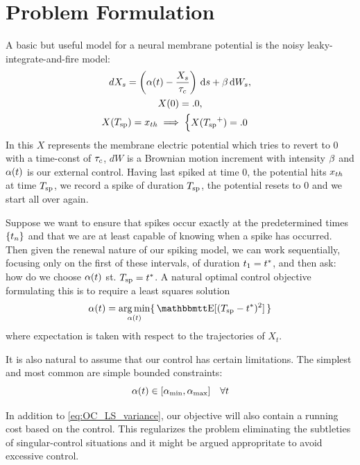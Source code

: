 \documentclass{article}
\begin{document}
\section{Problem Formulation}
A basic but useful model for a neural membrane potential is the noisy
leaky-integrate-and-fire model:
\begin{equation}
\begin{gathered} 
dX_s = \left({\alpha}(t) - \frac{X_s}{{ \tau_{c} }} \right) \, \mathrm{d} s + {\beta} \, \mathrm{d} W_s,
\\
X(0) = .0,
\\
X({ T_{\textrm{sp} } }) = { x_{th} } \implies  
\begin{cases}
X({ T_{\textrm{sp} } }^+) = .0 &  
\end{cases}
\end{gathered}
\label{eq:X_evolution_uo}
\end{equation}
In this $X$ represents the membrane electric potential which tries to revert to
$0$ with a time-const of ${ \tau_{c} }$, $dW$ is a Brownian motion increment with
intensity ${\beta}$ and ${\alpha}(t)$ is our external control. Having last spiked at
time $0$, the potential hits ${ x_{th} }$ at time ${ T_{\textrm{sp} } }$, we record a spike
of duration ${ T_{\textrm{sp} } }$, the potential resets to $0$ and we start all over again.  

Suppose we want to ensure that spikes occur exactly at the predetermined times
${ \{t_n \} }$ and that we are at least capable of knowing when a spike has occurred.
Then given the renewal nature of our spiking model, we can work sequentially,
focusing only on the first of these intervals, of duration $t_1 = { t^* }$, and then
ask: how do we choose ${\alpha}(t)$ st. ${ T_{\textrm{sp} } } = { t^* }$. A natural optimal control
objective formulating this is to require a least squares solution
\begin{equation}
\a(t) = \argmin_{\a(t)} \{\, \Exp[(\ts- \T)^2] \,\}
\label{eq:OC_LS_variance}   
\end{equation}
where expectation is taken with respect to the trajectories of $X_t$.

It is also natural to assume that our control has certain limitations. The
simplest and most common are simple bounded constraints:
\begin{equation}
{\alpha}(t) \in [{ {\alpha}_{\textrm{min}} }, { {\alpha}_{\textrm{max}} }] \quad \forall t
\label{eq:bound_constraints_alpha}
\end{equation}

In addition to \cref{eq:OC_LS_variance}, our objective will also contain a
running cost based on the control. This regularizes the problem eliminating the
subtleties of singular-control situations and it might be argued appropritate
to avoid excessive control.
\end{document}
